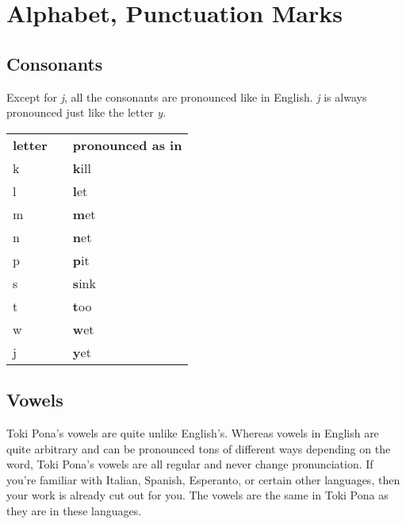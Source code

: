 \label{'pronunciation_alphabet'}
\section{Alphabet, Punctuation Marks}
%
\subsection*{Consonants}
%
Except for \textit{j}, all the consonants are pronounced like in English. 
\textit{j} is always pronounced just like the letter \textit{y}. 

\begin{supertabular}{p{2cm}|ll}
\textbf{letter}   &&    \textbf{pronounced as in} \\ %
k && \textbf{k}ill  \\ %
l && \textbf{l}et   \\ %
m && \textbf{m}et   \\ %
n && \textbf{n}et   \\ %
p && \textbf{p}it   \\ %
s && \textbf{s}ink  \\ %
t && \textbf{t}oo   \\ %
w && \textbf{w}et   \\ %
j && \textbf{y}et   \\ %
\end{supertabular} 

\subsection*{Vowels}
%
Toki Pona's vowels are quite unlike English's. Whereas vowels in English are quite arbitrary and can be pronounced tons of different ways depending on the word, Toki Pona's vowels are all regular and never change pronunciation. 
If you're familiar with Italian, Spanish, Esperanto, or certain other languages, then your work is already cut out for you. The vowels are the same in Toki Pona as they are in these languages. 

